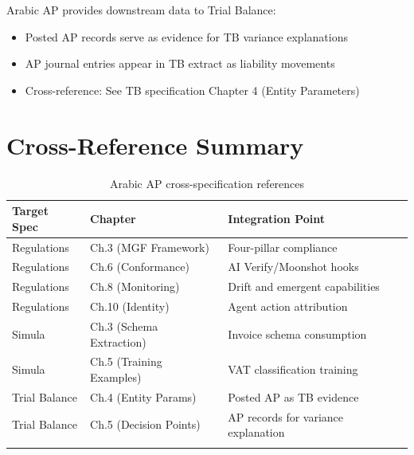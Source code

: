 Arabic AP provides downstream data to Trial Balance:

\begin{itemize}
  \item Posted AP records serve as evidence for TB variance explanations
  \item AP journal entries appear in TB extract as liability movements
  \item Cross-reference: See TB specification Chapter 4 (Entity Parameters)
\end{itemize}

\section{Cross-Reference Summary}
\label{sec:xref-summary}

\begin{longtable}{@{}p{3.5cm}p{4cm}p{5cm}@{}}
\toprule
\textbf{Target Spec} & \textbf{Chapter} & \textbf{Integration Point} \\
\midrule
\endhead
Regulations & Ch.3 (MGF Framework) & Four-pillar compliance \\
Regulations & Ch.6 (Conformance) & AI Verify/Moonshot hooks \\
Regulations & Ch.8 (Monitoring) & Drift and emergent capabilities \\
Regulations & Ch.10 (Identity) & Agent action attribution \\
\midrule
Simula & Ch.3 (Schema Extraction) & Invoice schema consumption \\
Simula & Ch.5 (Training Examples) & VAT classification training \\
\midrule
Trial Balance & Ch.4 (Entity Params) & Posted AP as TB evidence \\
Trial Balance & Ch.5 (Decision Points) & AP records for variance explanation \\
\bottomrule
\caption{Arabic AP cross-specification references}
\end{longtable}
